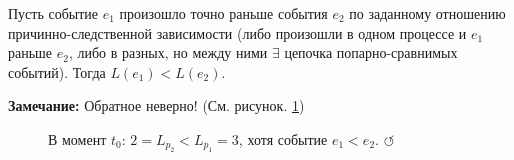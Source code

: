 \begin{theorem}
Пусть событие $e_1$ произошло точно раньше события $e_2$ по заданному отношению причинно-следственной зависимости (либо произошли в одном процессе и $e_1$ раньше $e_2$, либо в разных, но между ними $\exists$ цепочка попарно-сравнимых событий).
Тогда $L(e_1) < L(e_2)$.
\end{theorem}
\textbf{\hypertarget{backto}{Замечание:}} Обратное неверно! (См. рисунок. \ref{fig:image_Comparsion})
\begin{figure}[h!]
\caption{В момент $t_0$: $2 = L_{p_2} < L_{p_1} = 3$, хотя событие $e_1 < e_2$. \protect\hyperlink{backto}{$\circlearrowleft$}}
\label{fig:image_Comparsion}
\end{figure}
        
